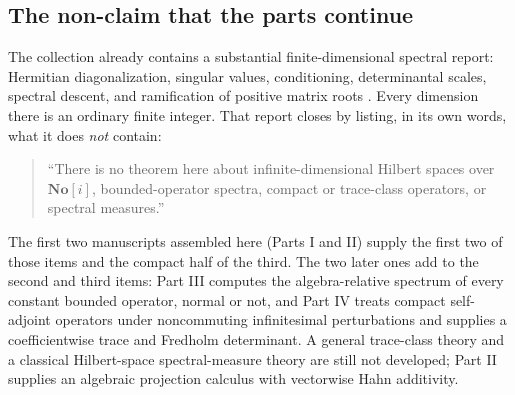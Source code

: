 \documentclass[11pt,a4paper]{article}
\numberwithin{equation}{section}
\theoremstyle{definition}
\theoremstyle{remark}
\newcommand{\No}{\mathbf{No}}
\begin{document}
\subsection{The non-claim that the parts continue}\label{ihs:sec:nonclaim}
The collection already contains a substantial finite-dimensional spectral
report: Hermitian diagonalization, singular values, conditioning,
determinantal scales, spectral descent, and ramification of positive matrix
roots \cite{RepoSpectral}. Every dimension there is an ordinary finite
integer. That report closes by listing, in its own words, what it does
\emph{not} contain:
\begin{quote}
``There is no theorem here about infinite-dimensional Hilbert spaces over
$\No[i]$, bounded-operator spectra, compact or trace-class operators,
or spectral measures.''
\end{quote}
The first two manuscripts assembled here (Parts I and II) supply the first
two of those items and the compact half of the third. The two later ones add
to the second and third items: Part III computes the algebra-relative
spectrum of every constant bounded operator, normal or not, and Part IV
treats compact self-adjoint operators under noncommuting infinitesimal
perturbations and supplies a coefficientwise trace and Fredholm determinant.
A general trace-class theory and a classical Hilbert-space spectral-measure
theory are still not developed; Part II supplies an algebraic projection
calculus with vectorwise Hahn additivity.
\end{document}

